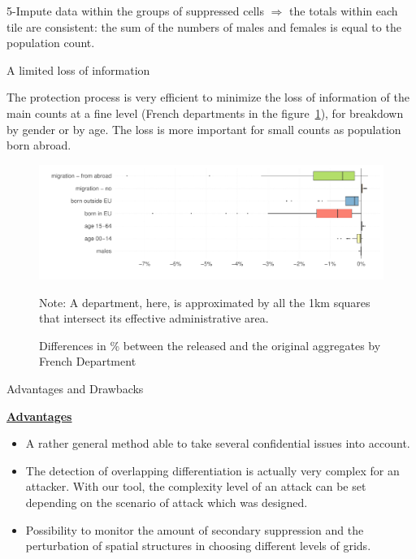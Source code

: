 \documentclass[final,xcolor={dvipsnames,svgnames,table}]{beamer}
\newlength{\colwidth}
\begin{document}
\begin{frame}[fragile,t]
\begin{columns}[t]
\begin{column}{\colwidth}
\begin{block}{5-Impute data within the groups of suppressed cells}
$\Rightarrow$ the totals within each tile are consistent: the sum of the numbers of males and females is equal to the population count.

  \end{block}

  \begin{block}{A limited loss of information}

The protection process is very efficient to minimize the loss of information of the main counts at a fine level (French departments in the figure~\ref{fig:loss}), for breakdown by gender or by age. The loss is more important for small counts as population born abroad.

\begin{figure}
    \centering
    \caption{Differences in \% between the released and the original aggregates by French Department}
    \vspace{-0.5cm}
    \includegraphics{Images/bilan_departemetal_ecart_pc_pr_poster.pdf}
    \vspace{-1cm}
    \begin{flushleft}
    \footnotesize Note: A department, here, is approximated by all the 1km squares that intersect its effective administrative area.
    \end{flushleft}
    
    \label{fig:loss}
\end{figure}
    
\end{block}  

\vspace{-0.5cm}
  \begin{backblock}{Advantages and Drawbacks}

\underline{\textbf{Advantages}}

\begin{itemize}
    \item A rather general method able to take several confidential issues into account.
    \item The detection of overlapping differentiation is actually very complex for an attacker. With our tool, the complexity level of an attack can be set depending on the scenario of attack which was designed. 
    \item Possibility to monitor the amount of secondary suppression and the perturbation of spatial structures in choosing different levels of grids.
\end{itemize}



\end{backblock}
\end{column}
\end{columns}
\end{frame}
\end{document}

